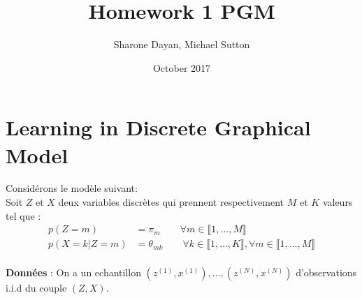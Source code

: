 \documentclass{article}
\title{Homework 1 PGM}
\author{Sharone Dayan, Michael Sutton }
\date{October 2017}
\begin{document}
\maketitle

\section{Learning in Discrete Graphical Model}

Considérons le modèle suivant: \\
Soit $Z$ et $X$ deux variables discrètes qui prennent respectivement $M$ et $K$ valeurs tel que :
\begin{align*} 
p(Z=m)&=\pi_m  \qquad \forall m \in \llbracket 1,\ldots,M \rrbracket\\
p(X=k|Z=m)&=\theta_{mk} \qquad \forall k \in \llbracket 1,\ldots,K \rrbracket, \forall m\in \llbracket 1,\ldots,M \rrbracket
\end{align*}
\\
\textbf{Données} : On a un echantillon  $(z^{(1)},x^{(1)}),\ldots,(z^{(N)},x^{(N)})$ d'observations i.i.d du couple $(Z,X)$.\\
\end{document}
